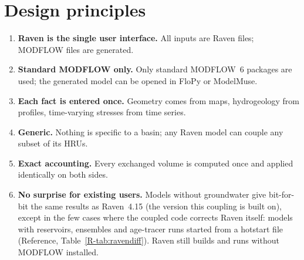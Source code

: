 \section{Design principles}
\begin{enumerate}
\item \textbf{Raven is the single user interface.} All inputs are Raven files; MODFLOW files are generated.
\item \textbf{Standard MODFLOW only.} Only standard MODFLOW~6 packages are used; the generated model can be opened in
FloPy or ModelMuse.
\item \textbf{Each fact is entered once.} Geometry comes from maps, hydrogeology from profiles, time-varying stresses
from time series.
\item \textbf{Generic.} Nothing is specific to a basin; any Raven model can couple any subset of its HRUs.
\item \textbf{Exact accounting.} Every exchanged volume is computed once and applied identically on both sides.
\item \textbf{No surprise for existing users.} Models without groundwater give bit-for-bit the same results as
Raven~4.15 (the version this coupling is built on), except in the few cases where the coupled code corrects Raven
itself: models with reservoirs, ensembles and age-tracer runs started from a hotstart file (Reference,
Table~\ref{R-tab:ravendiff}). Raven still builds and runs without MODFLOW installed.
\end{enumerate}

